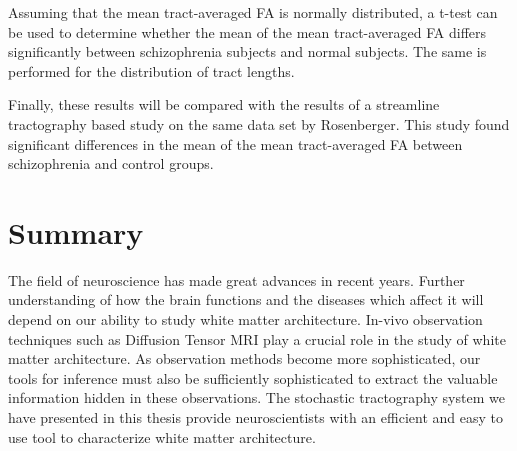 Assuming that the mean tract-averaged FA is normally distributed, a t-test can be used to determine whether the mean of the mean tract-averaged FA differs significantly between schizophrenia subjects and normal subjects.  The same is performed for the distribution of tract lengths.

Finally, these results will be compared with the results of a streamline tractography based study on the same data set by Rosenberger\cite{Rosenberger07}.  This study found significant differences in the mean of the mean tract-averaged FA between schizophrenia and control groups.

\section{Summary}
The field of neuroscience has made great advances in recent years.  Further understanding of how the brain functions and the diseases which affect it will depend on our ability to study white matter architecture.  In-vivo observation techniques such as Diffusion Tensor MRI play a crucial role in the study of white matter architecture.  As observation methods become more sophisticated, our tools for inference must also be sufficiently sophisticated to extract the valuable information hidden in these observations.  The stochastic tractography system we have presented in this thesis provide neuroscientists with an efficient and easy to use tool to characterize white matter architecture.


